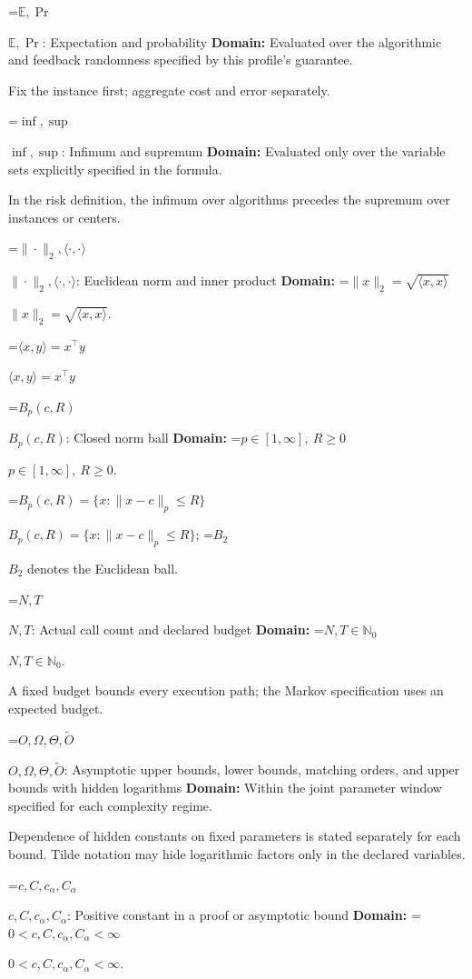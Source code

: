 \documentclass[10pt,a4paper]{article}
\newcommand{\AtlasMath}[1]{\par\begingroup\centering\setbox0=\hbox{$\displaystyle #1$}\ifdim\wd0>1.4\linewidth\typeout{ATLAS WIDE FORMULA: \the\wd0}\fi\ifdim\wd0>\linewidth\resizebox{\linewidth}{!}{\box0}\else\box0\fi\par\endgroup}
\newcommand{\AtlasInlineMath}[1]{\begingroup\setbox0=\hbox{$#1$}\ifdim\wd0>.4\linewidth\endgroup\AtlasMath{#1}\else\endgroup$#1$\fi}
\begin{document}
\AtlasInlineMath{\mathbb{E},\Pr}: Expectation and probability \textbf{Domain:} Evaluated over the algorithmic and feedback randomness specified by this profile's guarantee.



Fix the instance first; aggregate cost and error separately.



\AtlasInlineMath{\inf,\sup}: Infimum and supremum \textbf{Domain:} Evaluated only over the variable sets explicitly specified in the formula.



In the risk definition, the infimum over algorithms precedes the supremum over instances or centers.



\AtlasInlineMath{\|\cdot\|_2,\langle\cdot,\cdot\rangle}: Euclidean norm and inner product \textbf{Domain:} \AtlasInlineMath{\|x\|_2=\sqrt{\langle x,x\rangle}}.



\AtlasInlineMath{\langle x,y\rangle=x^\top y}



\AtlasInlineMath{B_p(c,R)}: Closed norm ball \textbf{Domain:} \AtlasInlineMath{p\in[1,\infty],\ R\ge0}.



\AtlasInlineMath{B_p(c,R)=\{x:\|x-c\|_p\le R\}}; \AtlasInlineMath{B_2} denotes the Euclidean ball.



\AtlasInlineMath{N,T}: Actual call count and declared budget \textbf{Domain:} \AtlasInlineMath{N,T\in\mathbb{N}_0}.



A fixed budget bounds every execution path; the Markov specification uses an expected budget.



\AtlasInlineMath{O,\Omega,\Theta,\widetilde{O}}: Asymptotic upper bounds, lower bounds, matching orders, and upper bounds with hidden logarithms \textbf{Domain:} Within the joint parameter window specified for each complexity regime.



Dependence of hidden constants on fixed parameters is stated separately for each bound. Tilde notation may hide logarithmic factors only in the declared variables.



\AtlasInlineMath{c,C,c_\alpha,C_\alpha}: Positive constant in a proof or asymptotic bound \textbf{Domain:} \AtlasInlineMath{0<c,C,c_\alpha,C_\alpha<\infty}.
\end{document}
